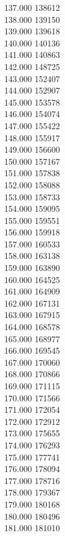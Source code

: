 { 137.000	138612 \\
 138.000	139150 \\
 139.000	139618 \\
 140.000	140136 \\
 141.000	140863 \\
 142.000	148725 \\
 143.000	152407 \\
 144.000	152907 \\
 145.000	153578 \\
 146.000	154074 \\
 147.000	155422 \\
 148.000	155917 \\
 149.000	156600 \\
 150.000	157167 \\
 151.000	157838 \\
 152.000	158088 \\
 153.000	158733 \\
 154.000	159095 \\
 155.000	159551 \\
 156.000	159918 \\
 157.000	160533 \\
 158.000	163138 \\
 159.000	163890 \\
 160.000	164525 \\
 161.000	164909 \\
 162.000	167131 \\
 163.000	167915 \\
 164.000	168578 \\
 165.000	168977 \\
 166.000	169545 \\
 167.000	170060 \\
 168.000	170866 \\
 169.000	171115 \\
 170.000	171566 \\
 171.000	172054 \\
 172.000	172912 \\
 173.000	175655 \\
 174.000	176293 \\
 175.000	177741 \\
 176.000	178094 \\
 177.000	178716 \\
 178.000	179367 \\
 179.000	180168 \\
 180.000	180496 \\
 181.000	181010 \\
}

